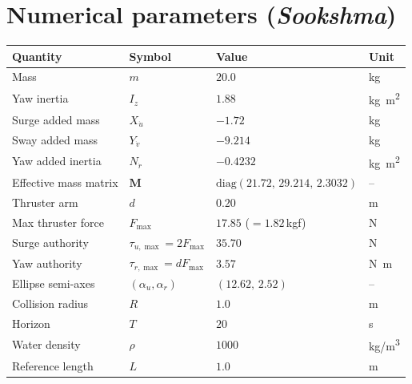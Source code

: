 \documentclass[11pt]{article}
\begin{document}
\section{Numerical parameters (\emph{Sookshma})}
\begin{center}
\begin{tabular}{@{}llll@{}}
\toprule
Quantity & Symbol & Value & Unit\\
\midrule
Mass & $m$ & $20.0$ & \si{kg}\\
Yaw inertia & $I_z$ & $1.88$ & \si{kg.m^2}\\
Surge added mass & $X_{\dot u}$ & $-1.72$ & \si{kg}\\
Sway added mass & $Y_{\dot v}$ & $-9.214$ & \si{kg}\\
Yaw added inertia & $N_{\dot r}$ & $-0.4232$ & \si{kg.m^2}\\
Effective mass matrix & $\mathbf{M}$ & $\mathrm{diag}(21.72,\,29.214,\,2.3032)$ & --\\
Thruster arm & $d$ & $0.20$ & \si{m}\\
Max thruster force & $F_{\max}$ & $17.85$ ($=1.82$\,kgf) & \si{N}\\
Surge authority & $\tau_{u,\max}=2F_{\max}$ & $35.70$ & \si{N}\\
Yaw authority & $\tau_{r,\max}=dF_{\max}$ & $3.57$ & \si{N.m}\\
Ellipse semi-axes & $(\alpha_u,\alpha_r)$ & $(12.62,\,2.52)$ & --\\
Collision radius & $R$ & $1.0$ & \si{m}\\
Horizon & $T$ & $20$ & \si{s}\\
Water density & $\rho$ & $1000$ & \si{kg/m^3}\\
Reference length & $L$ & $1.0$ & \si{m}\\
\bottomrule
\end{tabular}
\end{center}

\end{document}
